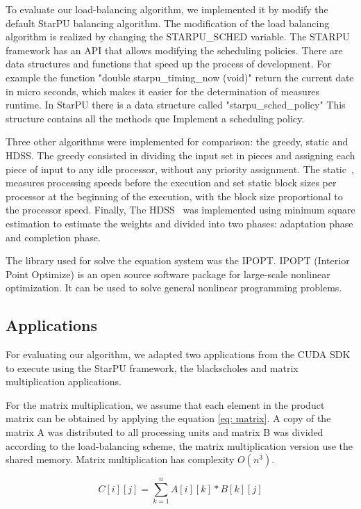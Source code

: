\documentclass[journal]{IEEEtran}
\begin{document}
To evaluate our load-balancing algorithm, we implemented it by modify the default StarPU balancing algorithm. The modification of the load balancing algorithm is realized by changing the STARPU\_SCHED variable. The STARPU framework has an API that allows modifying the scheduling policies. There are data structures and functions that speed up the process of development. For example the function "double starpu\_timing\_now (void)"  return the current date in micro seconds, which makes it easier for the determination of measures runtime. In StarPU there is a data structure called "starpu\_sched\_policy" This structure contains all the methods que Implement a scheduling policy. 

Three other algorithms were implemented for comparison: the greedy, static and
HDSS. The greedy consisted in dividing the input set in pieces and assigning
each piece of input to any idle processor, without any priority assignment. The
static~\cite{raphael}, measures processing speeds before the execution and set
static block sizes per processor at the beginning of the execution, with the
block size proportional to the processor speed. Finally, The HDSS~\cite{HDSS}
was implemented using minimum square estimation to estimate the weights and
divided into two phases: adaptation phase and completion phase.

The library used for solve the equation system was the IPOPT. IPOPT (Interior Point Optimize) is an open source software package for large-scale nonlinear optimization. It can be used to solve general nonlinear programming problems.

\subsection{Applications}

For evaluating our algorithm, we adapted two applications from the CUDA
SDK~\cite{cuda} to execute using the StarPU framework, the blackscholes and matrix
multiplication applications.

For the matrix multiplication, we assume that each element in the product matrix
can be obtained by applying the equation \ref{eq: matrix}. A copy of the matrix
A was distributed to all processing units and matrix B was divided according to
the load-balancing scheme, the matrix multiplication version use the shared memory. Matrix multiplication has complexity $O(n^3)$.

\begin{equation}
 C[i][j] = \sum_{k=1}^{n}  A[i][k] * B[k][j]
  \label{eq: matrix}
\end {equation}
\end{document}
